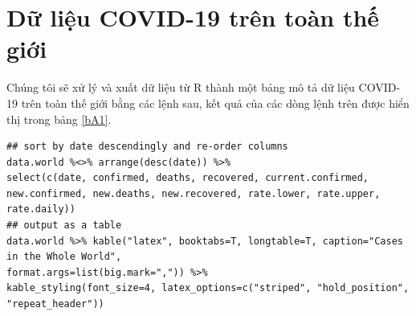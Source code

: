 \documentclass[12pt, a4paper,oneside]{book}
\theoremstyle{definition}
\begin{document}
\section{Dữ liệu COVID-19 trên toàn thế giới}
Chúng tôi sẽ xử lý và xuất dữ liệu từ R thành một bảng mô tả dữ liệu COVID-19 trên toàn thế giới bằng các lệnh sau, kết quả của các dòng lệnh trên  được hiển thị trong bảng \ref{bA1}.
\begin{lstlisting}
## sort by date descendingly and re-order columns
data.world %<>% arrange(desc(date)) %>% 
select(c(date, confirmed, deaths, recovered, current.confirmed,
new.confirmed, new.deaths, new.recovered, rate.lower, rate.upper, rate.daily))
## output as a table
data.world %>% kable("latex", booktabs=T, longtable=T, caption="Cases in the Whole World",
format.args=list(big.mark=",")) %>%
kable_styling(font_size=4, latex_options=c("striped", "hold_position", "repeat_header"))
\end{lstlisting}	
\begingroup\fontsize{4}{5}\selectfont
\end{document}
